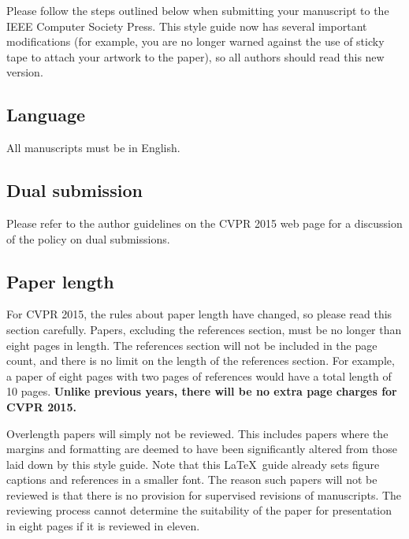 Please follow the steps outlined below when submitting your manuscript to
the IEEE Computer Society Press.  This style guide now has several
important modifications (for example, you are no longer warned against the
use of sticky tape to attach your artwork to the paper), so all authors
should read this new version.

\subsection{Language}

All manuscripts must be in English.

\subsection{Dual submission}

Please refer to the author guidelines on the CVPR 2015 web page for a
discussion of the policy on dual submissions.

\subsection{Paper length}
For CVPR 2015, the rules about paper length have changed, so please
read this section carefully. Papers, excluding the references section,
must be no longer than eight pages in length. The references section
will not be included in the page count, and there is no limit on the
length of the references section. For example, a paper of eight pages
with two pages of references would have a total length of 10 pages.
{\bf Unlike previous years, there will be no extra page charges for
  CVPR 2015.}

Overlength papers will simply not be reviewed.  This includes papers
where the margins and formatting are deemed to have been significantly
altered from those laid down by this style guide.  Note that this
\LaTeX\ guide already sets figure captions and references in a smaller font.
The reason such papers will not be reviewed is that there is no provision for
supervised revisions of manuscripts.  The reviewing process cannot determine
the suitability of the paper for presentation in eight pages if it is
reviewed in eleven.  

